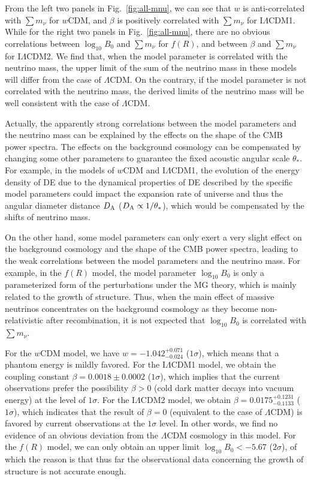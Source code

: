 \documentclass[aps,prd,nofootinbib,amsmath,amssymb,twocolumn,superscriptaddress,10pt]{revtex4}%
\begin{document}
From the left two panels in Fig.~\ref{fig:all-mnu}, we can see that $w$ is anti-correlated with $\sum m_{\nu}$ for $w$CDM, and $\beta$ is positively correlated with $\sum m_{\nu}$ for I$\Lambda$CDM1. While for the right two panels in Fig.~\ref{fig:all-mnu}, there are no obvious correlations between $\log_{10}B_{0}$ and $\sum m_{\nu}$ for $f(R)$, and between $\beta$ and $\sum m_{\nu}$ for I$\Lambda$CDM2. We find that, when the model parameter is correlated with the neutrino mass, the upper limit of the sum of the neutrino mass in these models will differ from the case of $\Lambda$CDM. On the contrary, if the model parameter is not correlated with the neutrino mass, the derived limits of the neutrino mass will be well consistent with the case of $\Lambda$CDM.

Actually, the apparently strong correlations between the model parameters and the neutrino mass can be explained by the effects on the shape of the CMB power spectra. The effects on the background cosmology can be compensated by changing some other parameters to guarantee the fixed acoustic angular scale $\theta_{*}$. For example, in the models of $w$CDM and I$\Lambda$CDM1, the evolution of the energy density of DE due to the dynamical properties of DE described by the specific model parameters could impact the expansion rate of universe and thus the angular diameter distance $D_{\rm A}$ ($D_{\rm A}\propto 1/\theta_{*}$), which would be compensated by the shifts of neutrino mass.

On the other hand, some model parameters can only exert a very slight effect on the background cosmology and the shape of the CMB power spectra, leading to the weak correlations between the model parameters and the neutrino mass. For example, in the $f(R)$ model, the model parameter $\log_{10}B_{0}$ is only a parameterized form of the perturbations under the MG theory, which is mainly related to the growth of structure. Thus, when the main effect of massive neutrinos concentrates on the background cosmology as they become non-relativistic after recombination, it is not expected that $\log_{10}B_{0}$ is correlated with $\sum m_{\nu}$.

For the $w$CDM model, we have $w=-1.042^{+0.071}_{-0.024}$ ($1\sigma$), which means that a phantom energy is mildly favored. 
For the I$\Lambda$CDM1 model, we obtain the coupling constant $\beta=0.0018\pm0.0002$ ($1\sigma$), which implies that the current observations prefer the possibility $\beta>0$ (cold dark matter decays into vacuum energy) at the level of $1\sigma$. For the I$\Lambda$CDM2 model, we obtain $\beta=0.0175^{+0.1231}_{-0.1133}$ ($1\sigma$), which indicates that the result of $\beta=0$ (equivalent to the case of $\Lambda$CDM) is favored by current observations at the $1\sigma$ level. In other words, we find no evidence of an obvious deviation from the $\Lambda$CDM cosmology in this model.
For the $f(R)$ model, we can only obtain an upper limit $\log_{10}B_{0}<-5.67$ ($2\sigma$), of which the reason is that thus far the observational data concerning the growth of structure is not accurate enough.
\end{document}
